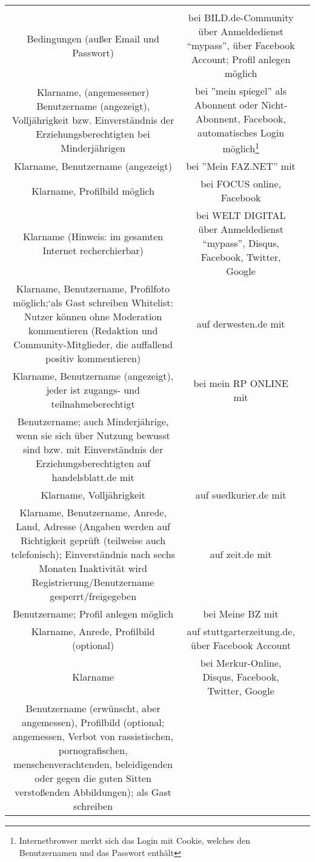 \begin{landscape}
\begin{tabular}{ccc}
{		
Registrierung/Anmeldung/Login  \\
Bedingungen (außer Email und Passwort)
 &		%
		bei BILD.de-Community über Anmeldedienst ``mypass'', über Facebook Account; Profil anlegen möglich\\
		Klarname, (angemessener) Benutzername (angezeigt), Volljährigkeit bzw. Einverständnis der Erziehungsberechtigten bei Minderjährigen
		&
		bei ''mein spiegel'' als Abonnent oder Nicht-Abonnent, Facebook, automatisches Login möglich\footnote{Internetbrowser merkt sich das Login mit Cookie, welches den Benutzernamen und das Passwort enthält} \\
		Klarname, Benutzername (angezeigt)
		&
		bei ''Mein FAZ.NET'' mit\\
		Klarname, Profilbild möglich
		&
		bei FOCUS online, Facebook\\
		Klarname (Hinweis: im gesamten Internet recherchierbar)
		&
		bei WELT DIGITAL über Anmeldedienst ``mypass'', Disqus, Facebook, Twitter, Google\\
		Klarname, Benutzername, Profilfoto möglich;`als Gast schreiben
		Whitelist: Nutzer können ohne Moderation kommentieren (Redaktion und Community-Mitglieder, die auffallend positiv 					kommentieren)
		&
		auf derwesten.de mit\\
		Klarname, Benutzername (angezeigt), jeder ist zugangs- und teilnahmeberechtigt
		&
		bei mein RP ONLINE mit\\
		Benutzername; auch Minderjährige, wenn sie sich über Nutzung bewusst sind bzw. mit Einverständnis der Erziehungsberechtigten
		auf handelsblatt.de mit\\
		Klarname, Volljährigkeit
		&
		auf suedkurier.de mit \\
		Klarname, Benutzername, Anrede, Land, Adresse (Angaben werden auf Richtigkeit geprüft (teilweise auch telefonisch); Einverständnis nach sechs Monaten Inaktivität wird Registrierung/Benutzername gesperrt/freigegeben
		&
		auf zeit.de mit\\
		Benutzername; Profil anlegen möglich
		&
		bei Meine BZ mit\\
		Klarname, Anrede, Profilbild (optional)
		&
		auf stuttgarterzeitung.de, über Facebook Account \\
		Klarname
		&
		bei Merkur-Online, Disqus, Facebook, Twitter, Google\\
		Benutzername (erwünscht, aber angemessen), Profilbild (optional; angemessen, Verbot von rassistischen, pornografischen, menschenverachtenden, beleidigenden oder gegen die guten Sitten verstoßenden Abbildungen); als Gast schreiben
}
\end{tabular}
\end{landscape}
